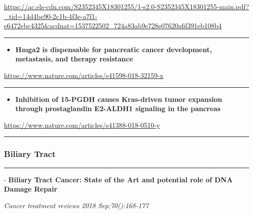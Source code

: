 \documentclass[]{article}
\providecommand{\tightlist}{%
  \setlength{\itemsep}{0pt}\setlength{\parskip}{0pt}}
\begin{document}
\url{https://ac.els-cdn.com/S2352345X18301255/1-s2.0-S2352345X18301255-main.pdf?_tid=14d4be90-2c1b-4f3e-a7f1-e6472ebc4325\&acdnat=1537522502_724a83ab9e728e07620a6f391eb108b4}

\begin{center}\rule{0.5\linewidth}{\linethickness}\end{center}

\begin{itemize}
\tightlist
\item
  \textbf{Hmga2 is dispensable for pancreatic cancer development,
  metastasis, and therapy resistance}
\end{itemize}

\url{https://www.nature.com/articles/s41598-018-32159-x}

\begin{center}\rule{0.5\linewidth}{\linethickness}\end{center}

\begin{itemize}
\tightlist
\item
  \textbf{Inhibition of 15-PGDH causes Kras-driven tumor expansion
  through prostaglandin E2-ALDH1 signaling in the pancreas}
\end{itemize}

\url{https://www.nature.com/articles/s41388-018-0510-y}

\begin{center}\rule{0.5\linewidth}{\linethickness}\end{center}

\hypertarget{biliary-tract-3}{%
\subsubsection{Biliary Tract}\label{biliary-tract-3}}

\begin{center}\rule{0.5\linewidth}{\linethickness}\end{center}

 - \textbf{Biliary Tract Cancer: State of the Art and potential role of
DNA Damage Repair}

\emph{Cancer treatment reviews 2018 Sep;70():168-177}
\end{document}
